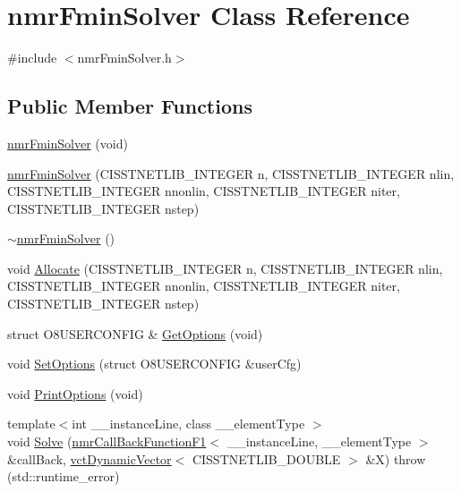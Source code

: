 \hypertarget{classnmr_fmin_solver}{\section{nmr\-Fmin\-Solver Class Reference}
\label{classnmr_fmin_solver}
}


{\ttfamily \#include $<$nmr\-Fmin\-Solver.\-h$>$}

\subsection*{Public Member Functions}
\begin{DoxyCompactItemize}
\item 
\hyperlink{classnmr_fmin_solver_a85595f69959139e1cb81d4086fadcc08}{nmr\-Fmin\-Solver} (void)
\item 
\hyperlink{classnmr_fmin_solver_a40c8467dd19a70eee7789b4c59300da0}{nmr\-Fmin\-Solver} (C\-I\-S\-S\-T\-N\-E\-T\-L\-I\-B\-\_\-\-I\-N\-T\-E\-G\-E\-R n, C\-I\-S\-S\-T\-N\-E\-T\-L\-I\-B\-\_\-\-I\-N\-T\-E\-G\-E\-R nlin, C\-I\-S\-S\-T\-N\-E\-T\-L\-I\-B\-\_\-\-I\-N\-T\-E\-G\-E\-R nnonlin, C\-I\-S\-S\-T\-N\-E\-T\-L\-I\-B\-\_\-\-I\-N\-T\-E\-G\-E\-R niter, C\-I\-S\-S\-T\-N\-E\-T\-L\-I\-B\-\_\-\-I\-N\-T\-E\-G\-E\-R nstep)
\item 
\hyperlink{classnmr_fmin_solver_a67649282c5176c615e72c3a0fe30a1c9}{$\sim$nmr\-Fmin\-Solver} ()
\item 
void \hyperlink{classnmr_fmin_solver_a45785e934e8cca9db41d55445b898f02}{Allocate} (C\-I\-S\-S\-T\-N\-E\-T\-L\-I\-B\-\_\-\-I\-N\-T\-E\-G\-E\-R n, C\-I\-S\-S\-T\-N\-E\-T\-L\-I\-B\-\_\-\-I\-N\-T\-E\-G\-E\-R nlin, C\-I\-S\-S\-T\-N\-E\-T\-L\-I\-B\-\_\-\-I\-N\-T\-E\-G\-E\-R nnonlin, C\-I\-S\-S\-T\-N\-E\-T\-L\-I\-B\-\_\-\-I\-N\-T\-E\-G\-E\-R niter, C\-I\-S\-S\-T\-N\-E\-T\-L\-I\-B\-\_\-\-I\-N\-T\-E\-G\-E\-R nstep)
\item 
struct O8\-U\-S\-E\-R\-C\-O\-N\-F\-I\-G \& \hyperlink{classnmr_fmin_solver_a98c569b9d97ad5b39925a19ac78cf7a1}{Get\-Options} (void)
\item 
void \hyperlink{classnmr_fmin_solver_a76f1b98e70619d84258af750561d5cfb}{Set\-Options} (struct O8\-U\-S\-E\-R\-C\-O\-N\-F\-I\-G \&user\-Cfg)
\item 
void \hyperlink{classnmr_fmin_solver_a914f7b5c2001ef16dc990d3631bf5685}{Print\-Options} (void)
\item 
{\footnotesize template$<$int \-\_\-\-\_\-instance\-Line, class \-\_\-\-\_\-element\-Type $>$ }\\void \hyperlink{classnmr_fmin_solver_a4028e6d3a6d765870fddcd5a388b4a57}{Solve} (\hyperlink{classnmr_call_back_function_f1}{nmr\-Call\-Back\-Function\-F1}$<$ \-\_\-\-\_\-instance\-Line, \-\_\-\-\_\-element\-Type $>$ \&call\-Back, \hyperlink{classvct_dynamic_vector}{vct\-Dynamic\-Vector}$<$ C\-I\-S\-S\-T\-N\-E\-T\-L\-I\-B\-\_\-\-D\-O\-U\-B\-L\-E $>$ \&X)  throw (std\-::runtime\-\_\-error)

\end{DoxyCompactItemize}
